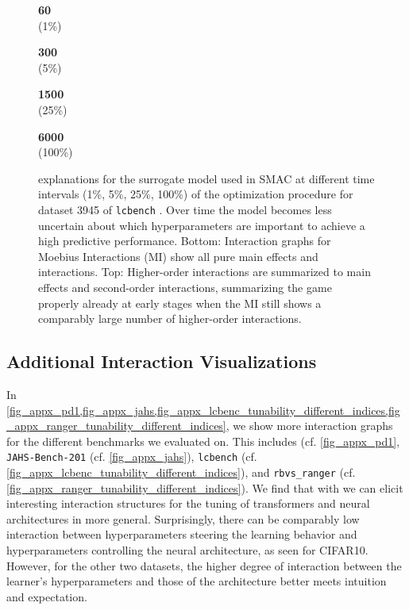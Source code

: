 \documentclass[letterpaper]{article} %
\begin{document}
\begin{figure}[htb]
\begin{minipage}[c]{0.23\textwidth}
        \centering\textbf{60}\\(1\%)      
    \end{minipage}
    \begin{minipage}[c]{0.23\textwidth}
        \centering\textbf{300}\\(5\%)
    \end{minipage}
    \begin{minipage}[c]{0.23\textwidth}
        \centering\textbf{1500}\\(25\%)
    \end{minipage}
    \begin{minipage}[c]{0.23\textwidth}
        \centering\textbf{6000}\\(100\%)
    \end{minipage}
    \caption{\tool \dstunability explanations for the surrogate model used in SMAC at different time intervals (1\%, 5\%, 25\%, 100\%) of the optimization procedure for dataset 3945 of \texttt{lcbench} \cite{zimmer-tpami21a}. Over time the model becomes less uncertain about which hyperparameters are important to achieve a high predictive performance. Bottom: Interaction graphs for Moebius Interactions (MI) show all pure main effects and interactions. Top: Higher-order interactions are summarized to main effects and second-order interactions, summarizing the game properly already at early stages when the MI still shows a comparably large number of higher-order interactions.}
    \label{fig_appx_smac_analysis_surrogate}
\end{figure}

\subsection{Additional Interaction Visualizations}

In \cref{fig_appx_pd1,fig_appx_jahs,fig_appx_lcbenc_tunability_different_indices,fig_appx_ranger_tunability_different_indices}, we show more interaction graphs for the different benchmarks we evaluated \tool on. This includes \pdone (cf. \cref{fig_appx_pd1}, \texttt{JAHS-Bench-201} (cf. \cref{fig_appx_jahs}), \texttt{lcbench} (cf. \cref{fig_appx_lcbenc_tunability_different_indices}), and \texttt{rbvs\_ranger} (cf. \cref{fig_appx_ranger_tunability_different_indices}). We find that with \tool we can elicit interesting interaction structures for the tuning of transformers and neural architectures in more general. Surprisingly, there can be comparably low interaction between hyperparameters steering the learning behavior and hyperparameters controlling the neural architecture, as seen for CIFAR10. However, for the other two datasets, the higher degree of interaction between the learner's hyperparameters and those of the architecture better meets intuition and expectation.
\end{document}
